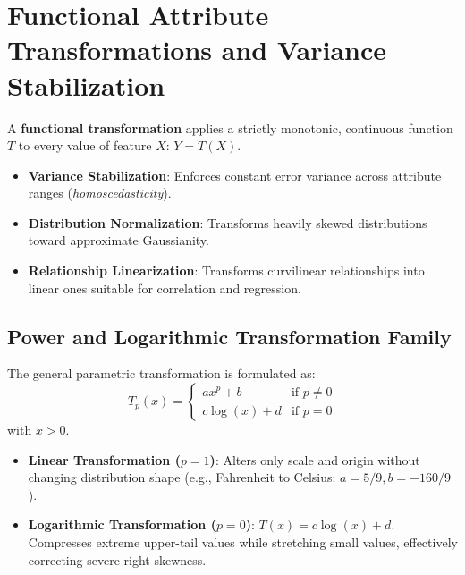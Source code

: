 \section{Functional Attribute Transformations and Variance Stabilization}
\label{sec:dm-functional-transformations}

A \textbf{functional transformation} applies a strictly monotonic, continuous function $T$ to every value of feature $X$: $Y = T(X)$.
\begin{itemize}[noitemsep]
    \item \textbf{Variance Stabilization}: Enforces constant error variance across attribute ranges (\textit{homoscedasticity}).
    \item \textbf{Distribution Normalization}: Transforms heavily skewed distributions toward approximate Gaussianity.
    \item \textbf{Relationship Linearization}: Transforms curvilinear relationships into linear ones suitable for correlation and regression.
\end{itemize}

\subsection{Power and Logarithmic Transformation Family}
The general parametric transformation is formulated as:
\begin{equation}
    T_p(x) = \begin{cases}
        a x^p + b & \text{if } p \neq 0 \\
        c \log(x) + d & \text{if } p = 0
    \end{cases}
\end{equation}
with $x > 0$.
\begin{itemize}
    \item \textbf{Linear Transformation ($p = 1$)}: Alters only scale and origin without changing distribution shape (e.g., Fahrenheit to Celsius: $a=5/9, b=-160/9$).
    \item \textbf{Logarithmic Transformation ($p = 0$)}: $T(x) = c\log(x) + d$. Compresses extreme upper-tail values while stretching small values, effectively correcting severe right skewness.
\end{itemize}

